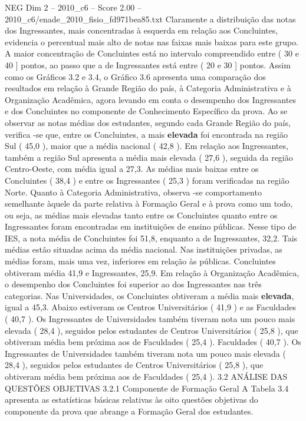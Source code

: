 \begin{textsample}{NEG Dim 2 – 2010\_c6 – Score 2.00 – 2010\_c6/enade\_2010\_fisio\_fd971bea85.txt}
Claramente a distribuição das notas dos Ingressantes, mais concentradas à esquerda em relação aos Concluintes, evidencia o percentual mais alto de notas nas faixas mais baixas para este grupo.
A maior concentração de Concluintes está no intervalo compreendido entre ( 30 e 40 ] pontos, ao passo que a de Ingressantes está entre ( 20 e 30 ] pontos.
Assim como os Gráficos 3.2 e 3.4, o Gráfico 3.6 apresenta uma comparação dos resultados em relação à Grande Região do país, à Categoria Administrativa e à Organização Acadêmica, agora levando em conta o desempenho dos Ingressantes e dos Concluintes no componente de Conhecimento Específico da prova.
Ao se observar as notas médias dos estudantes, segundo cada Grande Região do país, verifica -se que, entre os Concluintes, a mais \textbf{elevada} foi encontrada na região Sul ( 45,0 ), maior que a média nacional ( 42,8 ).
Em relação aos Ingressantes, também a região Sul apresenta a média mais elevada ( 27,6 ), seguida da região Centro-Oeste, com média igual a 27,3.
As médias mais baixas entre os Concluintes ( 38,4 ) e entre os Ingressantes ( 25,3 ) foram verificadas na região Norte.
Quanto à Categoria Administrativa, observa -se comportamento semelhante àquele da parte relativa à Formação Geral e à prova como um todo, ou seja, as médias mais elevadas tanto entre os Concluintes quanto entre os Ingressantes foram encontradas em instituições de ensino públicas.
Nesse tipo de IES, a nota média de Concluintes foi 51,8, enquanto a de Ingressantes, 32,2.
Tais médias estão situadas acima da média nacional.
Nas instituições privadas, as médias foram, mais uma vez, inferiores em relação às públicas.
Concluintes obtiveram média 41,9 e Ingressantes, 25,9.
Em relação à Organização Acadêmica, o desempenho dos Concluintes foi superior ao dos Ingressantes nas três categorias.
Nas Universidades, os Concluintes obtiveram a média mais \textbf{elevada}, igual a 45,3.
Abaixo estiveram os Centros Universitários ( 41,9 ) e as Faculdades ( 40,7 ).
Os Ingressantes de Universidades também tiveram nota um pouco mais elevada ( 28,4 ), seguidos pelos estudantes de Centros Universitários ( 25,8 ), que obtiveram média bem próxima aos de Faculdades ( 25,4 ).
Faculdades ( 40,7 ).
Os Ingressantes de Universidades também tiveram nota um pouco mais elevada ( 28,4 ), seguidos pelos estudantes de Centros Universitários ( 25,8 ), que obtiveram média bem próxima aos de Faculdades ( 25,4 ). 3.2 ANÁLISE DAS QUESTÕES OBJETIVAS 3.2.1 Componente de Formação Geral A Tabela 3.4 apresenta as estatísticas básicas relativas às oito questões objetivas do componente da prova que abrange a Formação Geral dos estudantes.

\end{textsample}
